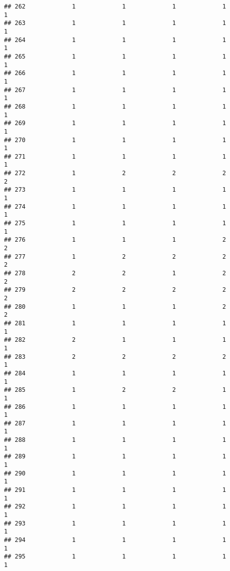 \documentclass[
]{article}
\begin{document}
\begin{verbatim}
## 262             1             1             1             1             1
## 263             1             1             1             1             1
## 264             1             1             1             1             1
## 265             1             1             1             1             1
## 266             1             1             1             1             1
## 267             1             1             1             1             1
## 268             1             1             1             1             1
## 269             1             1             1             1             1
## 270             1             1             1             1             1
## 271             1             1             1             1             1
## 272             1             2             2             2             2
## 273             1             1             1             1             1
## 274             1             1             1             1             1
## 275             1             1             1             1             1
## 276             1             1             1             2             2
## 277             1             2             2             2             2
## 278             2             2             1             2             2
## 279             2             2             2             2             2
## 280             1             1             1             2             2
## 281             1             1             1             1             1
## 282             2             1             1             1             1
## 283             2             2             2             2             1
## 284             1             1             1             1             1
## 285             1             2             2             1             1
## 286             1             1             1             1             1
## 287             1             1             1             1             1
## 288             1             1             1             1             1
## 289             1             1             1             1             1
## 290             1             1             1             1             1
## 291             1             1             1             1             1
## 292             1             1             1             1             1
## 293             1             1             1             1             1
## 294             1             1             1             1             1
## 295             1             1             1             1             1

\end{verbatim}
\end{document}
